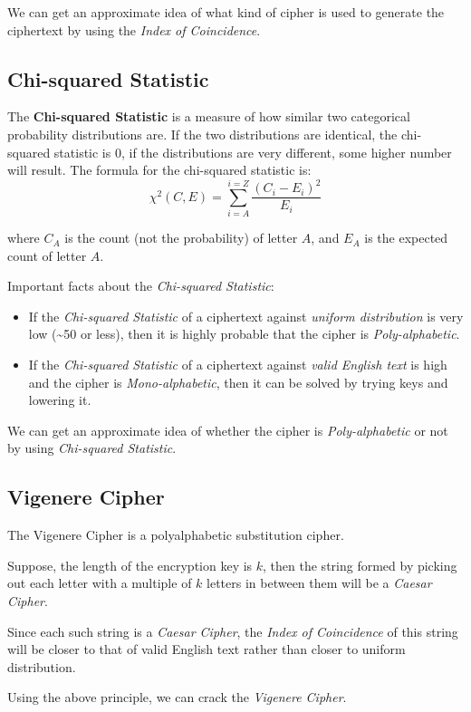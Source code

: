 \documentclass[10pt,twoside]{article}
\begin{document}
We can get an approximate idea of what kind of cipher is used to generate the ciphertext by using the \textit{Index of Coincidence}.

\subsection{Chi-squared Statistic} \label{chi}
The \textbf{Chi-squared Statistic} is a measure of how similar two categorical probability distributions are. If the two distributions are identical, the chi-squared statistic is 0, if the distributions are very different, some higher number will result. The formula for the chi-squared statistic is:
$$\chi^2(C,E) = \sum_{i=A}^{i=Z}\frac{(C_i-E_i)^2}{E_i}$$

where $C_A$ is the count (not the probability) of letter $A$, and $E_A$ is the expected count of letter $A$. \newline

Important facts about the \textit{Chi-squared Statistic}:
\begin{itemize}
  \setlength\itemsep{0em}
  \item If the \textit{Chi-squared Statistic} of a ciphertext against \textit{uniform distribution} is very low (\textasciitilde 50 or less), then it is highly probable that the cipher is \textit{Poly-alphabetic}.
  \item If the \textit{Chi-squared Statistic} of a ciphertext against \textit{valid English text} is high and the cipher is \textit{Mono-alphabetic}, then it can be solved by trying keys and lowering it.
\end{itemize}

We can get an approximate idea of whether the cipher is \textit{Poly-alphabetic} or not by using \textit{Chi-squared Statistic}.

\subsection{Vigenere Cipher} \label{vc}
The Vigenere Cipher is a polyalphabetic substitution cipher. \newline

Suppose, the length of the encryption key is $k$, then the string formed by picking out each letter with a multiple of $k$ letters in between them will be a \textit{Caesar Cipher}. \newline

Since each such string is a \textit{Caesar Cipher}, the \textit{Index of Coincidence} of this string will be closer to that of valid English text rather than closer to uniform distribution. \newline

Using the above principle, we can crack the \textit{Vigenere Cipher}.
\end{document}
